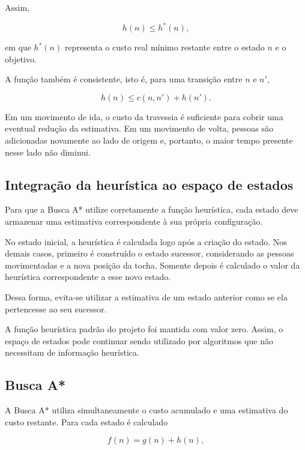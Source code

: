 Assim,

\begin{equation}
	h(n) \leq h^*(n),
\end{equation}

em que $h^*(n)$ representa o custo real mínimo restante entre o estado $n$ e
o objetivo.

A função também é consistente, isto é, para uma transição entre $n$ e $n'$,

\begin{equation}
	h(n) \leq c(n,n') + h(n').
\end{equation}

Em um movimento de ida, o custo da travessia é suficiente para cobrir uma
eventual redução da estimativa. Em um movimento de volta, pessoas são
adicionadas novamente ao lado de origem e, portanto, o maior tempo presente
nesse lado não diminui.

\subsection{Integração da heurística ao espaço de estados}

Para que a Busca A* utilize corretamente a função heurística, cada estado deve
armazenar uma estimativa correspondente à sua própria configuração.

No estado inicial, a heurística é calculada logo após a criação do estado. Nos
demais casos, primeiro é construído o estado sucessor, considerando as pessoas
movimentadas e a nova posição da tocha. Somente depois é calculado o valor da
heurística correspondente a esse novo estado.

Dessa forma, evita-se utilizar a estimativa de um estado anterior como se ela
pertencesse ao seu sucessor.

A função heurística padrão do projeto foi mantida com valor zero. Assim, o
espaço de estados pode continuar sendo utilizado por algoritmos que não
necessitam de informação heurística.

\subsection{Busca A*}

A Busca A* utiliza simultaneamente o custo acumulado e uma estimativa do custo
restante. Para cada estado é calculado

\begin{equation}
	f(n)=g(n)+h(n),
\end{equation}

